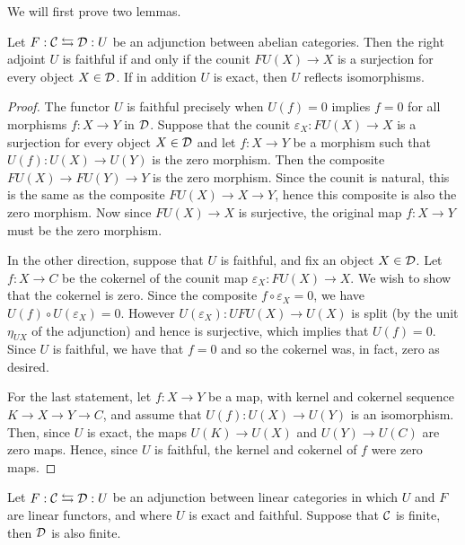 \documentclass{amsart}
\begin{document}
We will first prove two lemmas.

\begin{lemma}\label{lem:fiaghtfulrightadjoint}
	Let $F: \mathcal C \leftrightarrows \mathcal D: U$ be an adjunction between abelian categories. Then the right adjoint $U$ is faithful if and only if the counit $FU(X) \to X$ is a surjection for every object $X \in \mathcal D$. If in addition $U$ is exact, then $U$ reflects isomorphisms. 
\end{lemma}

\begin{proof}
	The functor $U$ is faithful precisely when $U(f) = 0$ implies $f=0$ for all morphisms $f: X \to Y$ in $\mathcal D$. Suppose that the counit $\varepsilon_X: FU(X) \to X$ is a surjection for every object $X \in \mathcal D$ and let $f: X \to Y$ be a morphism such that $U(f): U(X) \to U(Y)$ is the zero morphism. Then the composite $FU(X) \to FU(Y) \to Y$ is the zero morphism. Since the counit is natural, this is the same as the composite $FU(X) \to X \to Y$, hence this composite is also the zero morphism. Now since $FU(X) \to X$ is surjective, the original map $f: X \to Y$ must be the zero morphism. 
	
	In the other direction, suppose that $U$ is faithful, and fix an object $X \in \mathcal D$. Let $f: X \to C$ be the cokernel of the counit map $\varepsilon_X: FU(X) \to X$. We wish to show that the cokernel is zero.  Since the composite $f \circ \varepsilon_X =0 $, we have $U(f) \circ U(\varepsilon_X) = 0$. However $U(\varepsilon_X): UFU(X) \to U(X)$ is split (by the unit $\eta_{UX}$ of the adjunction) and hence is surjective, which implies that $U(f) = 0$. Since $U$ is faithful, we have that $f=0$ and so the cokernel was, in fact, zero as desired.   
	
For the last statement, let $f: X \to Y$ be a map, with kernel and cokernel sequence $K \to X \to Y \to C$, and assume that $U(f): U(X) \to U(Y)$ is an isomorphism. Then, since $U$ is exact, the maps $U(K) \to U(X)$	    and $U(Y) \to U(C)$ are zero maps. Hence, since $U$ is faithful, the kernel and cokernel of $f$ were zero maps. 
\end{proof}



\begin{lemma}\label{lem:recognizefinitecats}
	Let $F: \mathcal C \leftrightarrows \mathcal D: U$ be an adjunction between linear categories in which $U$ and $F$ are linear functors, and where $U$ is exact and faithful. Suppose that $\mathcal C$ is finite, then $\mathcal D$ is also finite. 
\end{lemma}
\end{document}
